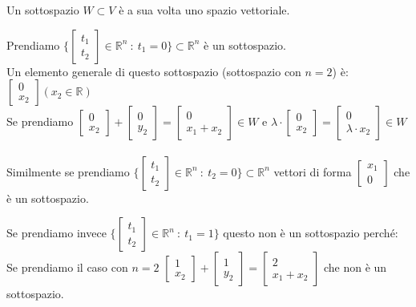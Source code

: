 \begin{proposition}
Un sottospazio $W \subset V$ è a sua volta uno spazio vettoriale.
\end{proposition}

\begin{example}
Prendiamo $\Bigg \{\begin{bmatrix}t_1\\ t_2\end{bmatrix} \in \mathbb{R}^n \: : \: t_1 = 0\Bigg\} \subset \mathbb{R}^n$ è un sottospazio.\\
Un elemento generale di questo sottospazio (sottospazio con $n=2$) è: $\begin{bmatrix}0\\x_2\end{bmatrix}(x_2 \in \mathbb{R})$\\
Se prendiamo $\begin{bmatrix}0\\x_2\end{bmatrix} + \begin{bmatrix}0\\y_2\end{bmatrix} = \begin{bmatrix}0\\x_1 + x_2\end{bmatrix} \in W$ e $\lambda \cdot \begin{bmatrix}0\\x_2\end{bmatrix} = \begin{bmatrix}0\\\lambda \cdot x_2\end{bmatrix} \in W$\\\\
Similmente se prendiamo $\Bigg \{\begin{bmatrix}t_1\\ t_2\end{bmatrix} \in \mathbb{R}^n \: : \: t_2 = 0\Bigg\} \subset \mathbb{R}^n$ vettori di forma  $\begin{bmatrix}x_1\\0\end{bmatrix}$ che è un sottospazio.
\end{example}

\begin{example}
Se prendiamo invece $\Bigg \{\begin{bmatrix}t_1\\ t_2\end{bmatrix} \in \mathbb{R}^n \: : \: t_1 = 1\Bigg\}$ questo non è un sottospazio perché:
Se prendiamo il caso con $n=2$ $\begin{bmatrix}1\\x_2\end{bmatrix} + \begin{bmatrix}1\\y_2\end{bmatrix} = \begin{bmatrix}2\\x_1 + x_2\end{bmatrix}$ che non è un sottospazio.
\end{example}

